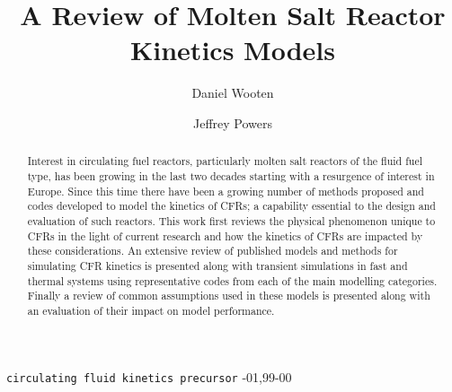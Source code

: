 \documentclass[review]{elsarticle}
\begin{document}
\begin{frontmatter}

\title{A Review of Molten Salt Reactor Kinetics Models}

\author[ucb]{Daniel Wooten}
\address[ucb]{4155 Etcheverry Hall, MC 1730, University of California, Berkeley,
    Berkeley, CA 94720-1730}

\author[ornl]{Jeffrey Powers}
\address[ornl]{Oak Ridge}

\begin{abstract}
Interest in circulating fuel reactors, particularly molten salt reactors
 of the
fluid fuel type, has been growing in the last two decades starting with a
resurgence of interest in Europe. Since this time there have been a growing
number of methods proposed and codes developed to model the kinetics of CFRs;
a capability essential to the design and evaluation of such reactors. This work
first reviews the physical phenomenon unique to CFRs in the light of current
research and how the kinetics of CFRs are impacted by these considerations.
 An extensive review of published models and methods for simulating CFR kinetics
is presented along with transient simulations in fast and thermal systems using
representative codes from each of the main modelling categories. Finally a
review of common assumptions used in these models is presented along with an
evaluation of their impact on model performance. 
\end{abstract}

\begin{keyword}
\texttt{circulating fluid kinetics precursor}
-01\sep  99-00
\end{keyword}

\end{frontmatter}

\linenumbers
\end{document}
